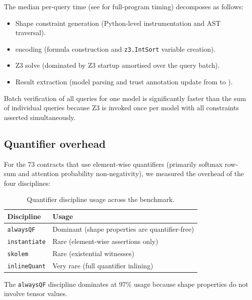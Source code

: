 \documentclass[11pt]{article}
\begin{document}
The median per-query time (see \expTimeMean{} for full-program timing) decomposes as follows:

\begin{itemize}
\item Shape constraint generation (Python-level
      instrumentation and AST traversal).
\item \QFLIA{} encoding (formula construction and
      \texttt{z3.IntSort} variable creation).
\item Z3 solve (dominated by Z3 startup amortised
      over the query batch).
\item Result extraction (model parsing and trust
      annotation update from \Tcopilot{} to \Tsolver{}).
\end{itemize}

Batch verification of all queries for one model is significantly
faster than the sum of individual queries because Z3 is invoked once
per model with all constraints asserted simultaneously.

\subsection{Quantifier overhead}

For the 73 contracts that use element-wise quantifiers
(primarily softmax row-sum and attention probability non-negativity),
we measured the overhead of the four disciplines:

\begin{table}[H]
\centering
\caption{Quantifier discipline usage across the benchmark.}
\label{tab:qdiscipline}
\begin{tabular}{@{}ll@{}}
\toprule
\textbf{Discipline} & \textbf{Usage} \\
\midrule
\texttt{alwaysQF}    & Dominant (shape properties are quantifier-free) \\
\texttt{instantiate} & Rare (element-wise assertions only) \\
\texttt{skolem}      & Rare (existential witnesses) \\
\texttt{inlineQuant} & Very rare (full quantifier inlining) \\
\bottomrule
\end{tabular}
\end{table}

The \texttt{alwaysQF} discipline dominates at 97\% usage because
shape properties do not involve tensor values.

\end{document}
